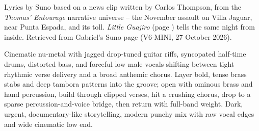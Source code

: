 

\label{sec:villa-jaguar}
\begin{notes}
Lyrics by Suno based on a news clip written by Carlos Thompson, from the \emph{Thomas' Entourage} narrative universe -- the November assault on Villa Jaguar, near Punta Espada, and its toll. \emph{Little Guajiro} (page \pageref{sec:little-guajiro}) tells the same night from inside. Retrieved from Gabriel's Suno page (V6-MINI, 27 October 2026).
\end{notes}
\begin{style}
Cinematic nu-metal with jagged drop-tuned guitar riffs, syncopated half-time drums, distorted bass, and forceful low male vocals shifting between tight rhythmic verse delivery and a broad anthemic chorus. Layer bold, tense brass stabs and deep tambora patterns into the groove; open with ominous brass and hand percussion, build through clipped verses, hit a crushing chorus, drop to a sparse percussion-and-voice bridge, then return with full-band weight. Dark, urgent, documentary-like storytelling, modern punchy mix with raw vocal edges and wide cinematic low end.
\end{style}
